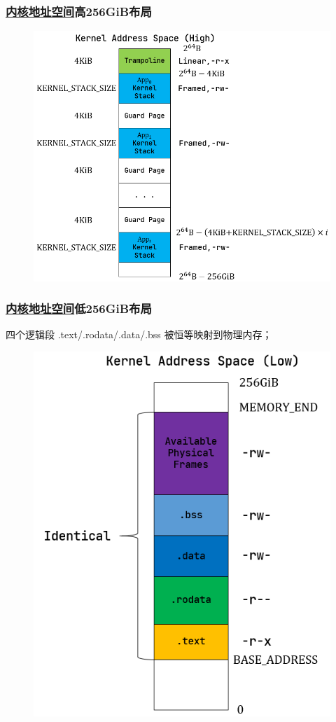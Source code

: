 \begin{frame}
    \frametitle{\href{https://rcore-os.github.io/rCore-Tutorial-Book-v3/chapter4/5kernel-app-spaces.html\#id6}{内核地址空间}高256GiB布局}
% 
% 
    \begin{figure}
        \centering
        \includegraphics[width=0.5\linewidth]{figs/kernel-as-high.png}
    \end{figure}
% 
% 
\end{frame}
\begin{frame}
    \frametitle{\href{https://rcore-os.github.io/rCore-Tutorial-Book-v3/chapter4/5kernel-app-spaces.html\#id6}{内核地址空间}低256GiB布局}
四个逻辑段 .text/.rodata/.data/.bss 被恒等映射到物理内存；
    \begin{figure}
        \centering
        \includegraphics[width=0.35\linewidth]{figs/kernel-as-low.png}
    \end{figure}
% 
% 
% 
% 
% 
% 
% 
% 
\end{frame}
